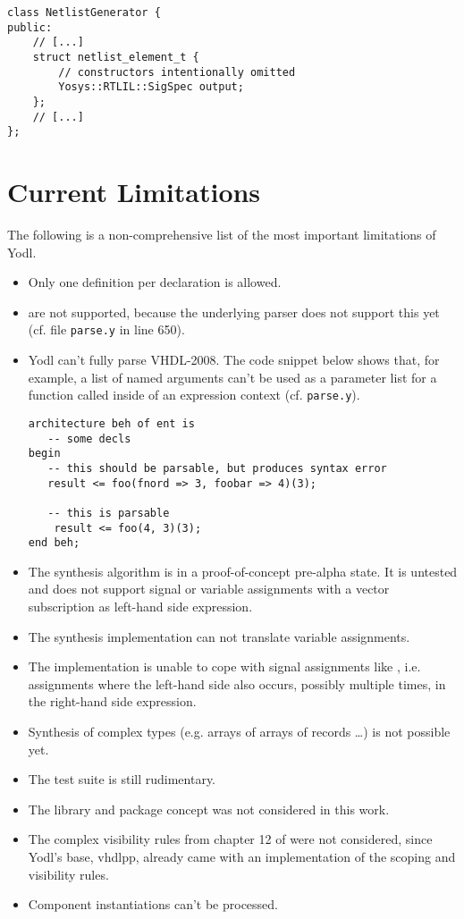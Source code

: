 \begin{lstlisting}[style=c++, caption={API of base netlist element},
    label={lst:netlistElem}]
class NetlistGenerator {
public:
    // [...]
    struct netlist_element_t {
        // constructors intentionally omitted
        Yosys::RTLIL::SigSpec output;
    };
    // [...]
};
\end{lstlisting}

\section{Current Limitations}
\label{sec:currentLimits}

The following is a non-comprehensive list of the most important
limitations of Yodl.

\begin{itemize}
    \item Only one  definition per 
    declaration is allowed.
    \item {} are not supported, because the
    underlying parser does not support this yet (cf. file
    \texttt{parse.y} in line 650).
    \item Yodl can't fully parse VHDL-2008. The code snippet below
    shows that, for example, a list of named arguments
    can't be used as a parameter list for a function called inside of
    an expression context (cf. \texttt{parse.y}).
    \begin{lstlisting}[style=vhdl]
architecture beh of ent is
   -- some decls
begin
   -- this should be parsable, but produces syntax error
   result <= foo(fnord => 3, foobar => 4)(3);

   -- this is parsable
    result <= foo(4, 3)(3);
end beh;
    \end{lstlisting}
    \item The synthesis algorithm is in a proof-of-concept pre-alpha
    state. It is untested and does not support signal or variable
    assignments with a vector subscription as left-hand side
    expression.
    \item The synthesis implementation can not translate variable
    assignments.
    \item The implementation is unable to cope with signal assignments
    like , i.e. assignments where the left-hand side
    also occurs, possibly multiple times, in the right-hand side
    expression.
    \item Synthesis of complex types (e.g. arrays of arrays of records
    \ldots) is not possible yet.
    \item The test suite is still rudimentary.
    \item The library and package concept was not considered in this work.
    \item The complex visibility rules from chapter 12 of
    \cite{IEEELRM} were not considered, since Yodl's base, vhdlpp,
    already came with an implementation of the scoping and visibility
    rules.
    \item Component instantiations can't be processed.
\end{itemize}

